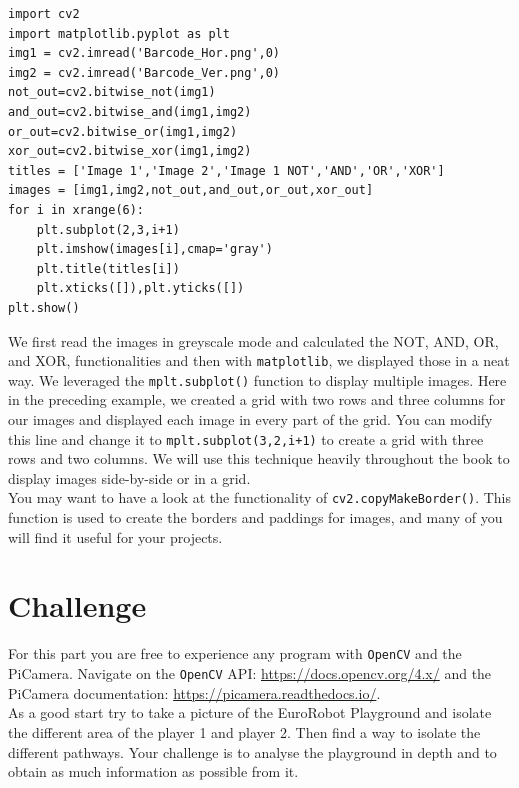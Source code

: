 \documentclass{labo}
\newcommand{\opencv}{\texttt{OpenCV} }
\begin{document}
\begin{verbatim}
import cv2
import matplotlib.pyplot as plt
img1 = cv2.imread('Barcode_Hor.png',0)
img2 = cv2.imread('Barcode_Ver.png',0)
not_out=cv2.bitwise_not(img1)
and_out=cv2.bitwise_and(img1,img2)
or_out=cv2.bitwise_or(img1,img2)
xor_out=cv2.bitwise_xor(img1,img2)
titles = ['Image 1','Image 2','Image 1 NOT','AND','OR','XOR']
images = [img1,img2,not_out,and_out,or_out,xor_out]
for i in xrange(6):
	plt.subplot(2,3,i+1)
	plt.imshow(images[i],cmap='gray')
	plt.title(titles[i])
	plt.xticks([]),plt.yticks([])
plt.show()
\end{verbatim}

We first read the images in greyscale mode and calculated the NOT, AND, OR, and XOR, functionalities and then with \texttt{matplotlib}, we displayed those in a neat way. We leveraged the \texttt{mplt.subplot()} function to display multiple images. Here in the preceding example, we created a grid with two rows and three columns for our images and displayed each image in every part of the grid. You can modify this line and change it to \texttt{mplt.subplot(3,2,i+1)} to create a grid with three rows and two columns. We will use this technique heavily throughout the book to display images side-by-side or in a grid.\\

You may want to have a look at the functionality of \texttt{cv2.copyMakeBorder()}. This function is used to create the borders and paddings for images, and many of you will find it useful for your projects.




\section*{Challenge}
For this part you are free to experience any program with \opencv and the PiCamera.
Navigate on the \opencv API: \url{https://docs.opencv.org/4.x/} and the PiCamera documentation: \url{https://picamera.readthedocs.io/}.\\

As a good start try to take a picture of the EuroRobot Playground and isolate the different area of the player 1 and player 2. Then find a way to isolate the different pathways.
Your challenge is to analyse the playground in depth and to obtain as much information as possible from it.



\end{document}
